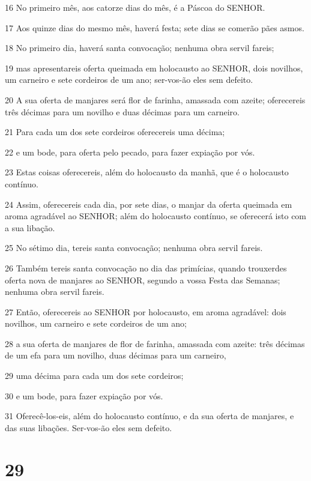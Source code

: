 \par 16 No primeiro mês, aos catorze dias do mês, é a Páscoa do SENHOR.
\par 17 Aos quinze dias do mesmo mês, haverá festa; sete dias se comerão pães asmos.
\par 18 No primeiro dia, haverá santa convocação; nenhuma obra servil fareis;
\par 19 mas apresentareis oferta queimada em holocausto ao SENHOR, dois novilhos, um carneiro e sete cordeiros de um ano; ser-vos-ão eles sem defeito.
\par 20 A sua oferta de manjares será flor de farinha, amassada com azeite; oferecereis três décimas para um novilho e duas décimas para um carneiro.
\par 21 Para cada um dos sete cordeiros oferecereis uma décima;
\par 22 e um bode, para oferta pelo pecado, para fazer expiação por vós.
\par 23 Estas coisas oferecereis, além do holocausto da manhã, que é o holocausto contínuo.
\par 24 Assim, oferecereis cada dia, por sete dias, o manjar da oferta queimada em aroma agradável ao SENHOR; além do holocausto contínuo, se oferecerá isto com a sua libação.
\par 25 No sétimo dia, tereis santa convocação; nenhuma obra servil fareis.
\par 26 Também tereis santa convocação no dia das primícias, quando trouxerdes oferta nova de manjares ao SENHOR, segundo a vossa Festa das Semanas; nenhuma obra servil fareis.
\par 27 Então, oferecereis ao SENHOR por holocausto, em aroma agradável: dois novilhos, um carneiro e sete cordeiros de um ano;
\par 28 a sua oferta de manjares de flor de farinha, amassada com azeite: três décimas de um efa para um novilho, duas décimas para um carneiro,
\par 29 uma décima para cada um dos sete cordeiros;
\par 30 e um bode, para fazer expiação por vós.
\par 31 Oferecê-los-eis, além do holocausto contínuo, e da sua oferta de manjares, e das suas libações. Ser-vos-ão eles sem defeito.

\chapter{29}

